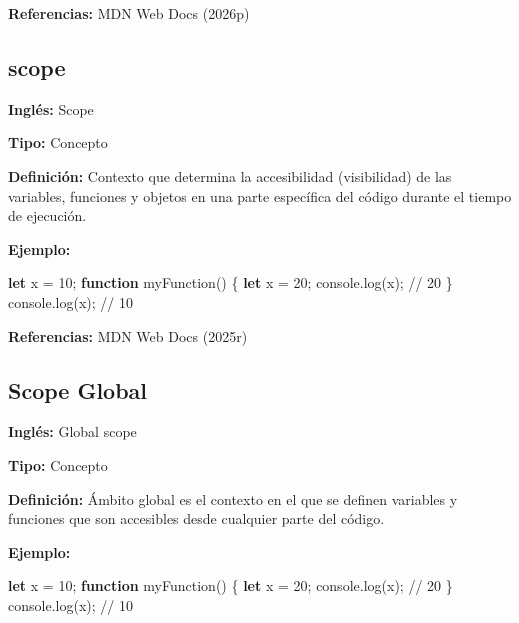 \documentclass[
  letterpaper,
  DIV=11,
  numbers=noendperiod]{scrreprt}
\newenvironment{Shaded}{\begin{snugshade}}{\end{snugshade}}
\newcommand{\BuiltInTok}[1]{\textcolor[rgb]{0.00,0.23,0.31}{#1}}
\newcommand{\CommentTok}[1]{\textcolor[rgb]{0.37,0.37,0.37}{#1}}
\newcommand{\DecValTok}[1]{\textcolor[rgb]{0.68,0.00,0.00}{#1}}
\newcommand{\FunctionTok}[1]{\textcolor[rgb]{0.28,0.35,0.67}{#1}}
\newcommand{\KeywordTok}[1]{\textcolor[rgb]{0.00,0.23,0.31}{\textbf{#1}}}
\newcommand{\NormalTok}[1]{\textcolor[rgb]{0.00,0.23,0.31}{#1}}
\newcommand{\OperatorTok}[1]{\textcolor[rgb]{0.37,0.37,0.37}{#1}}
\let\oldsubsection\subsection
\renewcommand{\subsection}{\phantomsection\oldsubsection}
\begin{document}
\textbf{Referencias:} MDN Web Docs (2026p)

\subsection*{scope}\label{glos-scope}

\textbf{Inglés:} Scope

\textbf{Tipo:} Concepto

\textbf{Definición:} Contexto que determina la accesibilidad
(visibilidad) de las variables, funciones y objetos en una parte
específica del código durante el tiempo de ejecución.

\textbf{Ejemplo:}

\begin{Shaded}
\begin{Highlighting}[]
\KeywordTok{let}\NormalTok{ x }\OperatorTok{=} \DecValTok{10}\OperatorTok{;}
\KeywordTok{function} \FunctionTok{myFunction}\NormalTok{() \{}
    \KeywordTok{let}\NormalTok{ x }\OperatorTok{=} \DecValTok{20}\OperatorTok{;}
    \BuiltInTok{console}\OperatorTok{.}\FunctionTok{log}\NormalTok{(x)}\OperatorTok{;} \CommentTok{// 20}
\NormalTok{\}}
\BuiltInTok{console}\OperatorTok{.}\FunctionTok{log}\NormalTok{(x)}\OperatorTok{;} \CommentTok{// 10}
\end{Highlighting}
\end{Shaded}

\textbf{Referencias:} MDN Web Docs (2025r)

\subsection*{Scope Global}\label{glos-scope_global}

\textbf{Inglés:} Global scope

\textbf{Tipo:} Concepto

\textbf{Definición:} Ámbito global es el contexto en el que se definen
variables y funciones que son accesibles desde cualquier parte del
código.

\textbf{Ejemplo:}

\begin{Shaded}
\begin{Highlighting}[]
\KeywordTok{let}\NormalTok{ x }\OperatorTok{=} \DecValTok{10}\OperatorTok{;}
\KeywordTok{function} \FunctionTok{myFunction}\NormalTok{() \{}
    \KeywordTok{let}\NormalTok{ x }\OperatorTok{=} \DecValTok{20}\OperatorTok{;}
    \BuiltInTok{console}\OperatorTok{.}\FunctionTok{log}\NormalTok{(x)}\OperatorTok{;} \CommentTok{// 20}
\NormalTok{\}}
\BuiltInTok{console}\OperatorTok{.}\FunctionTok{log}\NormalTok{(x)}\OperatorTok{;} \CommentTok{// 10}
\end{Highlighting}
\end{Shaded}
\end{document}
